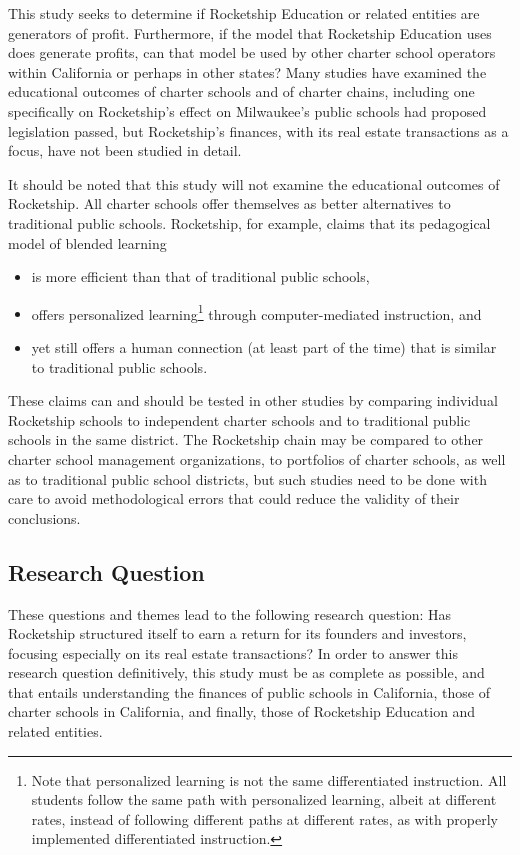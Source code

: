 This study seeks to determine if Rocketship Education or related entities are generators of profit. Furthermore, if the model that Rocketship Education uses does generate profits, can that model be used by other charter school operators within California or perhaps in other states? Many studies have examined the educational outcomes of charter schools and of charter chains, including one specifically on Rocketship's effect on Milwaukee's public schools had proposed legislation passed, but Rocketship's finances, with its real estate transactions as a focus, have not been studied in detail.

It should be noted that this study will not examine the educational outcomes of Rocketship. All charter schools offer themselves as better alternatives to traditional public schools. Rocketship, for example, claims that its pedagogical model of blended learning
\begin{itemize}
  \item is more efficient than that of traditional public schools,
  \item offers personalized learning\footnote{Note that personalized learning is not the same differentiated instruction. All students follow the same path with personalized learning, albeit at different rates, instead of following different paths at different rates, as with properly implemented differentiated instruction.} through computer-mediated instruction, and
  \item yet still offers a human connection (at least part of the time) that is similar to traditional public schools.
\end{itemize}
These claims can and should be tested in other studies by comparing individual Rocketship schools to independent charter schools and to traditional public schools in the same district. The Rocketship chain may be compared to other charter school management organizations, to portfolios of charter schools, as well as to traditional public school districts, but such studies need to be done with care to avoid methodological errors that could reduce the validity of their conclusions.

\subsection{Research Question}\label{sec:research-question}\indent

These questions and themes lead to the following research question: Has Rocketship structured itself to earn a return for its founders and investors, focusing especially on its real estate transactions? In order to answer this research question definitively, this study must be as complete as possible, and that entails understanding the finances of public schools in California, those of charter schools in California, and finally, those of Rocketship Education and related entities.

